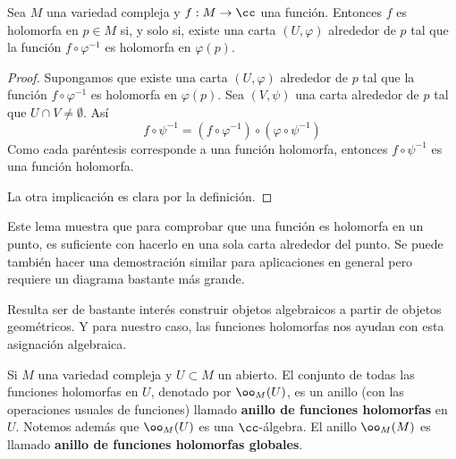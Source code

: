 		
    \begin{lemma}
		Sea $M$ una variedad compleja y $f:M\to\cc$ una función. Entonces $f$ es holomorfa en $p\in M$ si, y solo si, existe una carta $(U,\varphi)$ alrededor de $p$ tal que la función $f\circ \varphi^{-1}$ es holomorfa en $\varphi(p)$.
	\end{lemma}
	\begin{proof}
		Supongamos que existe una carta $(U,\varphi)$ alrededor de $p$ tal que la función $f\circ \varphi^{-1}$ es holomorfa en $\varphi(p)$. Sea $(V,\psi)$ una carta alrededor de $p$ tal que $U\cap V\neq \emptyset$. Así
		\begin{equation*}
			f\circ \psi^{-1}=(f\circ\varphi^{-1})\circ(\varphi\circ\psi^{-1})
		\end{equation*}
		Como cada paréntesis corresponde a una función holomorfa, entonces $f\circ \psi^{-1}$ es una función holomorfa.\\
		\begin{center}
		\end{center}
		
		La otra implicación es clara por la definición.
	\end{proof}
	
	Este lema muestra que para comprobar que una función es holomorfa en un punto, es suficiente con hacerlo en una sola carta alrededor del punto. Se puede también hacer una demostración similar para aplicaciones en general pero requiere un diagrama bastante más grande. 

	Resulta ser de bastante interés construir objetos algebraicos a partir de objetos geométricos. Y para nuestro caso, las funciones holomorfas nos ayudan con esta asignación algebraica.
    \begin{remark}
        Si $M$ una variedad compleja y $U\subset M$ un abierto. El conjunto de todas las funciones holomorfas en $U$, denotado por $\oo_M(U)$, es un anillo (con las operaciones usuales de funciones) llamado \textbf{anillo de funciones holomorfas} en $U$. Notemos además que $\oo_M(U)$ es una $\cc$-álgebra.
        El anillo $\oo_M(M)$ es llamado \textbf{anillo de funciones holomorfas globales}.
         
    \end{remark}
	
